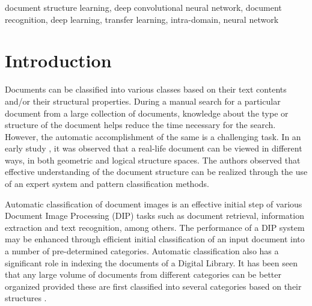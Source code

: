 \documentclass[10pt,conference,a4paper]{IEEEtran}
\begin{document}
\begin{IEEEkeywords}
document structure learning, deep convolutional neural network, document recognition, deep learning, transfer learning, intra-domain, neural network
\end{IEEEkeywords}

\section{Introduction}
Documents can be classified into various classes based on their text contents and/or their structural properties. During a manual search for a particular document from a large collection of documents, knowledge about the type or structure of the document helps reduce the time necessary for the search. However, the automatic accomplishment of the same is a challenging task. In an early study \cite{tang1991}, it was observed that a real-life document can be viewed in different ways, in both geometric and logical structure spaces. The authors observed that effective understanding of the document structure can be realized through the use of an expert system and pattern classification methods.

Automatic classification of document images is an effective initial step of various Document Image Processing (DIP) tasks such as document retrieval, information extraction and text recognition, among others. The performance of a DIP system may be enhanced through efficient initial classification of an input document into a number of pre-determined categories. Automatic classification also has a significant role in indexing the documents of a Digital Library. It has been seen that any large volume of documents from different categories can be better organized provided these are first classified into several categories based on their structures \cite{shin2001}.
\end{document}
